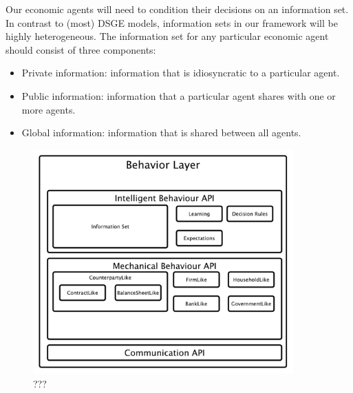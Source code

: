 \documentclass[11pt]{amsart}
\begin{document}
Our economic agents will need to condition their decisions on an information set.  In contrast to (most) DSGE models, information sets in our framework will be highly heterogeneous. The information set for any particular economic agent should consist of three components:
\begin{itemize}
    \item Private information: information that is idiosyncratic to a particular agent. 
    \item Public information: information that a particular agent shares with one or more agents.
    \item Global information: information that is shared between all agents.
\end{itemize}

\begin{figure}[H]
\centering
\includegraphics[width=10cm]{img/behavior-layer.pdf}
\caption{???}
\end{figure}
\end{document}
